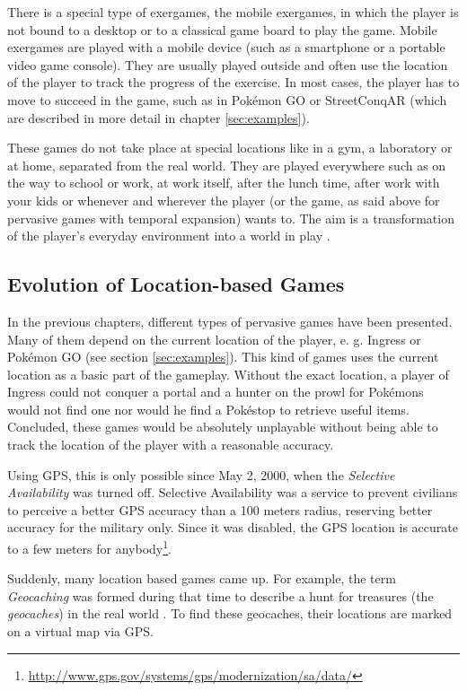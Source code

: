 There is a special type of exergames, the mobile exergames, in which the player is not bound to a desktop or to a classical game board to play the game. Mobile exergames are played with a mobile device (such as a smartphone or a portable video game console). They are usually played outside and often use the location of the player to track the progress of the exercise. In most cases, the player has to move to succeed in the game, such as in Pok\'{e}mon GO or StreetConqAR (which are described in more detail in chapter \ref{sec:examples}).

These games do not take place at special locations like in a gym, a laboratory or at home, separated from the real world. They are played everywhere such as on the way to school or work, at work itself, after the lunch time, after work with your kids or whenever and wherever the player (or the game, as said above for pervasive games with temporal expansion) wants to. The aim is a transformation of the player's everyday environment into a world in play \citep{nieuwdorp2009pervasive}.


\subsection{Evolution of Location-based Games}
In the previous chapters, different types of pervasive games have been presented. Many of them depend on the current location of the player, e. g. Ingress or Pok\'{e}mon GO (see section \ref{sec:examples}). This kind of games uses the current location as a basic part of the gameplay. Without the exact location, a player of Ingress could not conquer a portal and a hunter on the prowl for Pok\'{e}mons would not find one nor would he find a Pok\'{e}stop to retrieve useful items. Concluded, these games would be absolutely unplayable without being able to track the location of the player with a reasonable accuracy.

Using GPS, this is only possible since May 2, 2000, when the \emph{Selective Availability} was turned off. Selective Availability was a service to prevent civilians to perceive a better GPS accuracy than a 100 meters radius, reserving better accuracy for the military only. Since it was disabled, the GPS location is accurate to a few meters for anybody\footnote{\url{http://www.gps.gov/systems/gps/modernization/sa/data/}}.

Suddenly, many location based games came up. For example, the term \emph{Geocaching} was formed during that time to describe a hunt for treasures (the \emph{geocaches}) in the real world \citep{Geocaching}. To find these geocaches, their locations are marked on a virtual map via GPS.

